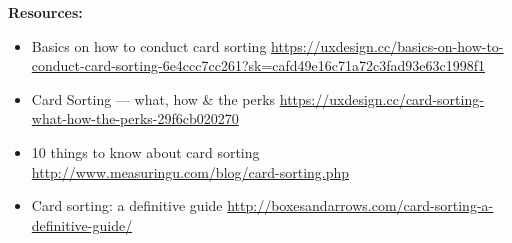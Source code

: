 \textbf{Resources:}

\begin{itemize}
\item Basics on how to conduct card sorting \url{https://uxdesign.cc/basics-on-how-to-conduct-card-sorting-6e4ccc7cc261?sk=cafd49e16c71a72c3fad93e63c1998f1}
\item Card Sorting  ---  what, how \& the perks \url{https://uxdesign.cc/card-sorting-what-how-the-perks-29f6cb020270}
\item 10 things to know about card sorting \url{http://www.measuringu.com/blog/card-sorting.php}
\item Card sorting: a definitive guide \url{http://boxesandarrows.com/card-sorting-a-definitive-guide/}
\end{itemize}

